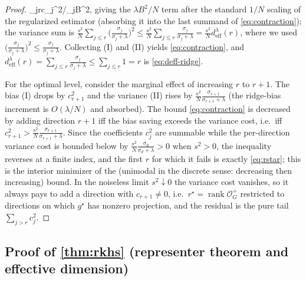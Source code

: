 \documentclass[aps,prxquantum,reprint,amsmath,amssymb,floatfix,nofootinbib,superscriptaddress,longbibliography]{revtex4-2}
\theoremstyle{remark}
\newcommand{\calO}{\mathcal{O}}
\begin{document}
\begin{proof}
\le\lambda\sum_{j\le r}c_j^2/\sigma_j\le\lambda B^2\), giving the
\(\lambda B^2/N\) term after the standard \(1/N\) scaling of the regularized
estimator (absorbing it into the last summand of \cref{eq:contraction}); the
variance sum is
\(\tfrac{s^2}{N}\sum_{j\le r}\bigl(\tfrac{\sigma_j}{\sigma_j+\lambda}\bigr)^2
\le\tfrac{s^2}{N}\sum_{j\le r}\tfrac{\sigma_j}{\sigma_j+\lambda}
=\tfrac{s^2}{N}d_{\mathrm{eff}}^{\lambda}(r)\), where we used
\(\bigl(\tfrac{\sigma_j}{\sigma_j+\lambda}\bigr)^2\le
\tfrac{\sigma_j}{\sigma_j+\lambda}\).  Collecting (I) and (II) yields
\cref{eq:contraction}, and \(d_{\mathrm{eff}}^{\lambda}(r)=\sum_{j\le r}
\tfrac{\sigma_j}{\sigma_j+\lambda}\le\sum_{j\le r}1=r\) is
\cref{eq:deff-ridge}.

For the optimal level, consider the marginal effect of increasing \(r\) to
\(r+1\).  The bias (I) drops by \(c_{r+1}^2\) and the variance (II) rises by
\(\tfrac{s^2}{N}\tfrac{\sigma_{r+1}}{\sigma_{r+1}+\lambda}\) (the ridge-bias
increment is \(O(\lambda/N)\) and absorbed).  The bound \eqref{eq:contraction} is
decreased by adding direction \(r+1\) iff the bias saving exceeds the variance
cost, i.e.\ iff \(c_{r+1}^2>\tfrac{s^2}{N}\tfrac{\sigma_{r+1}}
{\sigma_{r+1}+\lambda}\).  Since the coefficients \(c_j^2\) are summable while the
per-direction variance cost is bounded below by
\(\tfrac{s^2}{N}\tfrac{\sigma_d}{\sigma_d+\lambda}>0\) when \(s^2>0\), the
inequality reverses at a finite index, and the first \(r\) for which it fails is
exactly \eqref{eq:rstar}; this is the interior minimizer of the (unimodal in the
discrete sense: decreasing then increasing) bound.  In the noiseless limit
\(s^2\downarrow0\) the variance cost vanishes, so it always pays to add a
direction with \(c_{r+1}\ne0\), i.e.\ \(r^\star=\operatorname{rank}\calO_G^{+}\)
restricted to directions on which \(g^\star\) has nonzero projection, and the
residual is the pure tail \(\sum_{j>r}c_j^2\).
\end{proof}

\subsection{Proof of \texorpdfstring{\cref{thm:rkhs}}{Theorem 3} (representer
theorem and effective dimension)}
\label{app:rkhs}
\end{document}
